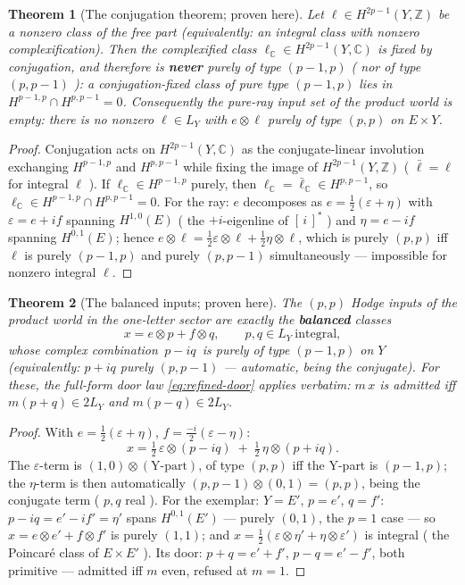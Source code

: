 \documentclass[11pt]{article}
\newcommand{\C}{\mathbb C}
\newcommand{\Z}{\mathbb Z}
\newtheorem{theorem}{Theorem}[section]
\begin{document}
\begin{theorem}[The conjugation theorem; proven here]\label{thm:hodge-typing}
Let $\ell\in H^{2p-1}(Y,\Z)$ be a nonzero class of the free part
(equivalently: an integral class with nonzero complexification). Then the
complexified class $\ell_\C\in H^{2p-1}(Y,\C)$ is fixed by conjugation,
and therefore is \textbf{never} purely of type $(p-1,p)$ ( nor of type
$(p,p-1)$ ): a conjugation-fixed class of pure type $(p-1,p)$ lies in
$H^{p-1,p}\cap H^{p,p-1}=0$.
Consequently the \emph{pure-ray} input set of the product world
\emph{is empty}: there is no nonzero $\ell\in L_Y$ with $e\otimes\ell$
purely of type $(p,p)$ on $E\times Y$.
\end{theorem}

\begin{proof}
Conjugation acts on $H^{2p-1}(Y,\C)$ as the conjugate-linear involution
exchanging $H^{p-1,p}$ and $H^{p,p-1}$ while fixing the image of
$H^{2p-1}(Y,\Z)$ ( $\bar\ell=\ell$ for integral $\ell$ ). If $\ell_\C\in
H^{p-1,p}$ purely, then $\ell_\C=\bar{\ell}_\C\in H^{p,p-1}$, so
$\ell_\C\in H^{p-1,p}\cap H^{p,p-1}=0$.
For the ray: $e$ decomposes as $e=\tfrac12(\varepsilon+\eta)$ with
$\varepsilon=e+if$ spanning $H^{1,0}(E)$ ( the $+i$-eigenline of
$[\,i\,]^\ast$ ) and $\eta=e-if$ spanning $H^{0,1}(E)$; hence
$e\otimes\ell=\tfrac12\varepsilon\otimes\ell+\tfrac12\eta\otimes\ell$,
which is purely $(p,p)$ iff $\ell$ is purely $(p-1,p)$ and purely
$(p,p-1)$ simultaneously --- impossible for nonzero integral $\ell$.
\end{proof}

\begin{theorem}[The balanced inputs; proven here]\label{thm:balanced}
The $(p,p)$ Hodge inputs of the product world in the one-letter sector
are exactly the \textbf{balanced} classes
\[
x=e\otimes p+f\otimes q,\qquad p,q\in L_Y\ \text{integral},
\]
whose complex combination $\,p-iq\,$ is purely of type $(p-1,p)$ on $Y$
(equivalently: $p+iq$ purely $(p,p-1)$ --- automatic, being the
conjugate). For these, the full-form door law
\eqref{eq:refined-door} applies verbatim: $m\,x$ is admitted iff
$m(p+q)\in2L_Y$ and $m(p-q)\in2L_Y$.
\end{theorem}

\begin{proof}
With $e=\tfrac12(\varepsilon+\eta)$, $f=\tfrac{-i}{2}(\varepsilon-\eta)$:
\[
x=\tfrac12\,\varepsilon\otimes(p-iq)\;+\;\tfrac12\,\eta\otimes(p+iq).
\]
The $\varepsilon$-term is $(1,0)\otimes(\text{Y-part})$, of type $(p,p)$
iff the Y-part is $(p-1,p)$; the $\eta$-term is then automatically
$(p,p-1)\otimes(0,1)=(p,p)$, being the conjugate term ( $p,q$ real ).
For the exemplar: $Y=E'$, $p=e'$, $q=f'$: $p-iq=e'-if'=\eta'$ spans
$H^{0,1}(E')$ --- purely $(0,1)$, the $p=1$ case --- so
$x=e\otimes e'+f\otimes f'$ is purely $(1,1)$; and
$x=\tfrac12(\varepsilon\otimes\eta'+\eta\otimes\varepsilon')$ is
integral ( the Poincaré class of $E\times E'$ ). Its door: $p+q=e'+f'$,
$p-q=e'-f'$, both primitive --- admitted iff $m$ even, refused at $m=1$.
\end{proof}
\end{document}
